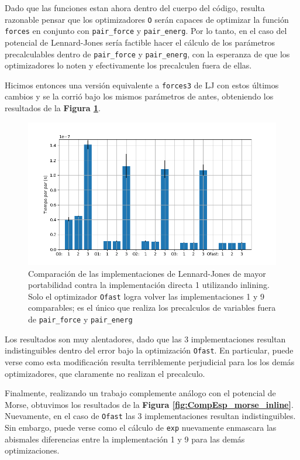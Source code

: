 \documentclass[twoside, 12pt]{article}
\begin{document}
Dado que las funciones estan ahora dentro del cuerpo del c\'odigo, resulta razonable pensar que los optimizadores \texttt{O} ser\'an capaces de optimizar la funci\'on \texttt{forces} en conjunto con \texttt{pair\_force} y \texttt{pair\_energ}. Por lo tanto, en el caso del potencial de Lennard-Jones ser\'ia factible hacer el c\'alculo de los par\'ametros precalculables dentro de \texttt{pair\_force} y \texttt{pair\_energ}, con la esperanza de que los optimizadores lo noten y efectivamente los precalculen fuera de ellas.

Hicimos entonces una versi\'on equivalente a \texttt{forces3} de LJ con estos últimos cambios y se la corri\'o bajo los mismos par\'ametros de antes, obteniendo los resultados de la \textbf{Figura \ref{fig:CompEsp_LJ_inline}}.

\begin{figure}[h]
	\centering
	\includegraphics[trim = 10mm 5mm 10mm 5mm, clip, width=0.6\columnwidth]{Comp_tiempos_LJ_inline.png}
	\caption{Comparaci\'on de las implementaciones de Lennard-Jones de mayor portabilidad contra la implementaci\'on directa 1 utilizando inlining. Solo el optimizador \texttt{Ofast} logra volver las implementaciones 1 y 9 comparables; es el \'unico que realiza los precalculos de variables fuera de \texttt{pair\_force} y \texttt{pair\_energ}}
	\label{fig:CompEsp_LJ_inline}
\end{figure}

Los resultados son muy alentadores, dado que las 3 implementaciones resultan indistinguibles dentro del error bajo la optimizaci\'on \texttt{Ofast}. En particular, puede verse como esta modificaci\'on resulta terriblemente perjudicial para los los dem\'as optimizadores, que claramente no realizan el precalculo. 

Finalmente, realizando un trabajo complemente an\'alogo con el potencial de Morse, obtuvimos los resultados de la \textbf{Figura \ref{fig:CompEsp_morse_inline}}. Nuevamente, en el caso de \texttt{Ofast} las 3 implementaciones resultan indistinguibles. Sin embargo, puede verse como el c\'alculo de \texttt{exp} nuevamente enmascara las abismales diferencias entre la implementaci\'on 1 y 9 para las dem\'as optimizaciones.
\end{document}
